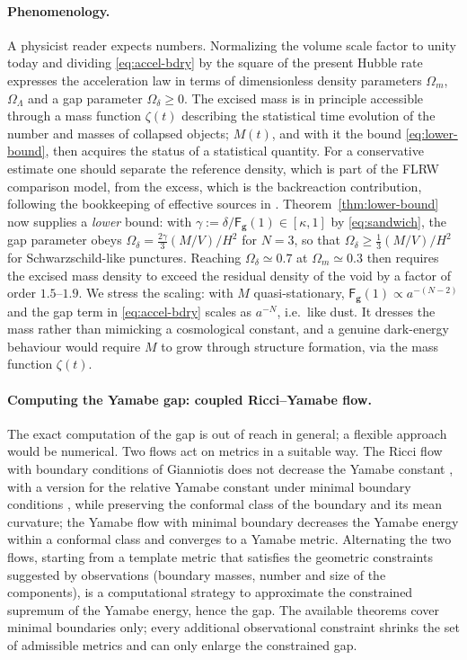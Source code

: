 \documentclass[aps,prd,reprint,amsmath,amssymb,nofootinbib,longbibliography]{revtex4-2}
\newcommand{\g}{\mathbf{g}}                 %
\newcommand{\Fq}{\mathsf{F}}                %
\theoremstyle{plain}
\theoremstyle{definition}
\theoremstyle{remark}
\begin{document}
\paragraph*{Phenomenology.}
A physicist reader expects numbers. Normalizing the volume scale factor to unity today and dividing \eqref{eq:accel-bdry} by the square of the present Hubble rate expresses the acceleration law in terms of dimensionless density parameters $\Omega_m$, $\Omega_\Lambda$ and a gap parameter $\Omega_\delta\ge0$. The excised mass is in principle accessible through a mass function $\zeta(t)$ describing the statistical time evolution of the number and masses of collapsed objects; $M(t)$, and with it the bound \eqref{eq:lower-bound}, then acquires the status of a statistical quantity. For a conservative estimate one should separate the reference density, which is part of the FLRW comparison model, from the excess, which is the backreaction contribution, following the bookkeeping of effective sources in \cite{brunswic2020gaussbonnetchern}. Theorem~\ref{thm:lower-bound} now supplies a \emph{lower} bound: with $\gamma:=\delta/\Fq_\g(1)\in[\kappa,1]$ by \eqref{eq:sandwich}, the gap parameter obeys $\Omega_\delta=\frac{2\gamma}{3}(M/V)/H^2$ for $N=3$, so that $\Omega_\delta\ge\frac{1}{3}(M/V)/H^2$ for Schwarzschild-like punctures. Reaching $\Omega_\delta\simeq0.7$ at $\Omega_m\simeq0.3$ then requires the excised mass density to exceed the residual density of the void by a factor of order $1.5$--$1.9$. We stress the scaling: with $M$ quasi-stationary, $\Fq_\g(1)\propto a^{-(N-2)}$ and the gap term in \eqref{eq:accel-bdry} scales as $a^{-N}$, i.e.\ like dust. It dresses the mass rather than mimicking a cosmological constant, and a genuine dark-energy behaviour would require $M$ to grow through structure formation, via the mass function $\zeta(t)$.

\paragraph*{Computing the Yamabe gap: coupled Ricci--Yamabe flow.}
The exact computation of the gap is out of reach in general; a flexible approach would be numerical. Two flows act on metrics in a suitable way. The Ricci flow with boundary conditions of Gianniotis \cite{MR3557306} does not decrease the Yamabe constant \cite{MR2326418}, with a version for the relative Yamabe constant under minimal boundary conditions \cite{MR4121783}, while preserving the conformal class of the boundary and its mean curvature; the Yamabe flow with minimal boundary \cite{MR4166805} decreases the Yamabe energy within a conformal class and converges to a Yamabe metric. Alternating the two flows, starting from a template metric that satisfies the geometric constraints suggested by observations (boundary masses, number and size of the components), is a computational strategy to approximate the constrained supremum of the Yamabe energy, hence the gap. The available theorems cover minimal boundaries only; every additional observational constraint shrinks the set of admissible metrics and can only enlarge the constrained gap.
\end{document}
